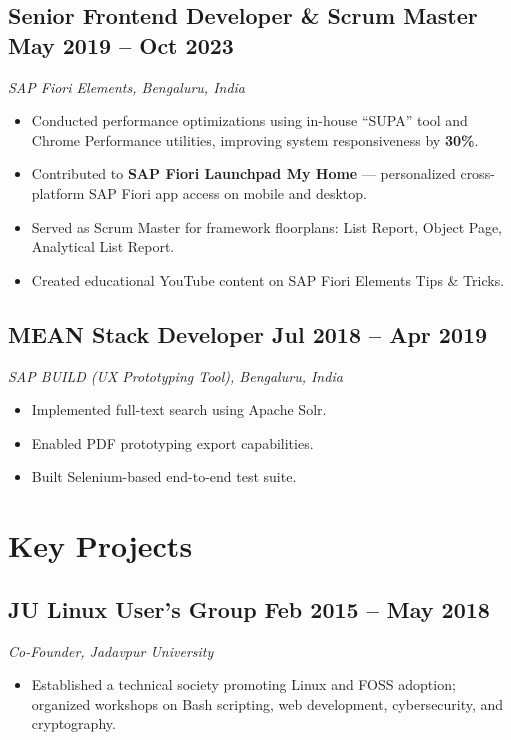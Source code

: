 \documentclass[11pt,a4paper]{article}
\begin{document}
\subsection{Senior Frontend Developer \& Scrum Master \hfill \normalfont\small May 2019 -- Oct 2023}
\textit{SAP Fiori Elements, Bengaluru, India}

\begin{itemize}
  \item Conducted performance optimizations using in-house ``SUPA'' tool and Chrome Performance
        utilities, improving system responsiveness by \textbf{30\%}.
  \item Contributed to \textbf{SAP Fiori Launchpad My Home} --- personalized cross-platform SAP Fiori
        app access on mobile and desktop.
  \item Served as Scrum Master for framework floorplans: List Report, Object Page, Analytical List Report.
  \item Created educational YouTube content on SAP Fiori Elements Tips \& Tricks.
\end{itemize}

\subsection{MEAN Stack Developer \hfill \normalfont\small Jul 2018 -- Apr 2019}
\textit{SAP BUILD (UX Prototyping Tool), Bengaluru, India}

\begin{itemize}
  \item Implemented full-text search using Apache Solr.
  \item Enabled PDF prototyping export capabilities.
  \item Built Selenium-based end-to-end test suite.
\end{itemize}

\section{Key Projects}

\subsection{JU Linux User's Group \hfill \normalfont\small Feb 2015 -- May 2018}
\textit{Co-Founder, Jadavpur University}
\begin{itemize}
  \item Established a technical society promoting Linux and FOSS adoption; organized workshops on
        Bash scripting, web development, cybersecurity, and cryptography.
\end{itemize}
\end{document}
